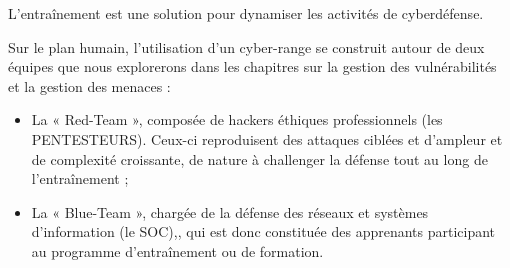 L'entraînement est une solution pour dynamiser les activités de cyberdéfense.





Sur le plan humain,  l'utilisation d'un cyber-range se construit autour de deux équipes que nous explorerons dans les chapitres sur la gestion des vulnérabilités et la gestion des menaces :

\begin{itemize}
  \item La « Red-Team », composée de hackers éthiques professionnels (les PENTESTEURS). Ceux-ci reproduisent des attaques ciblées et d’ampleur et de complexité croissante, de nature à challenger la défense tout au long de l’entraînement ;
  \item  La « Blue-Team », chargée de la défense des réseaux et systèmes d’information (le SOC),, qui est donc constituée des apprenants participant au programme d’entraînement ou de formation.
\end{itemize}






